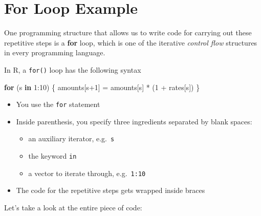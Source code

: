 \documentclass[
]{book}
\newenvironment{Shaded}{\begin{snugshade}}{\end{snugshade}}
\newcommand{\ControlFlowTok}[1]{\textcolor[rgb]{0.13,0.29,0.53}{\textbf{#1}}}
\newcommand{\DecValTok}[1]{\textcolor[rgb]{0.00,0.00,0.81}{#1}}
\newcommand{\NormalTok}[1]{#1}
\newcommand{\OtherTok}[1]{\textcolor[rgb]{0.56,0.35,0.01}{#1}}
\newcommand{\SpecialCharTok}[1]{\textcolor[rgb]{0.00,0.00,0.00}{#1}}
\begin{document}
\hypertarget{for-loop-example}{%
\section{For Loop Example}\label{for-loop-example}}

One programming structure that allows us to write code for carrying out
these repetitive steps is a \textbf{for} loop, which is one of the iterative
\emph{control flow} structures in every programming language.

In R, a \texttt{for()} loop has the following syntax

\begin{Shaded}
\begin{Highlighting}[]
\ControlFlowTok{for}\NormalTok{ (s }\ControlFlowTok{in} \DecValTok{1}\SpecialCharTok{:}\DecValTok{10}\NormalTok{) \{}
\NormalTok{  amounts[s}\SpecialCharTok{+}\DecValTok{1}\NormalTok{] }\OtherTok{=}\NormalTok{ amounts[s] }\SpecialCharTok{*}\NormalTok{ (}\DecValTok{1} \SpecialCharTok{+}\NormalTok{ rates[s])}
\NormalTok{\}}
\end{Highlighting}
\end{Shaded}

\begin{itemize}
\item
  You use the \texttt{for} statement
\item
  Inside parenthesis, you specify three ingredients separated by blank spaces:

  \begin{itemize}
  \item
    an auxiliary iterator, e.g.~\texttt{s}
  \item
    the keyword \texttt{in}
  \item
    a vector to iterate through, e.g.~\texttt{1:10}
  \end{itemize}
\item
  The code for the repetitive steps gets wrapped inside braces
\end{itemize}

Let's take a look at the entire piece of code:
\end{document}
